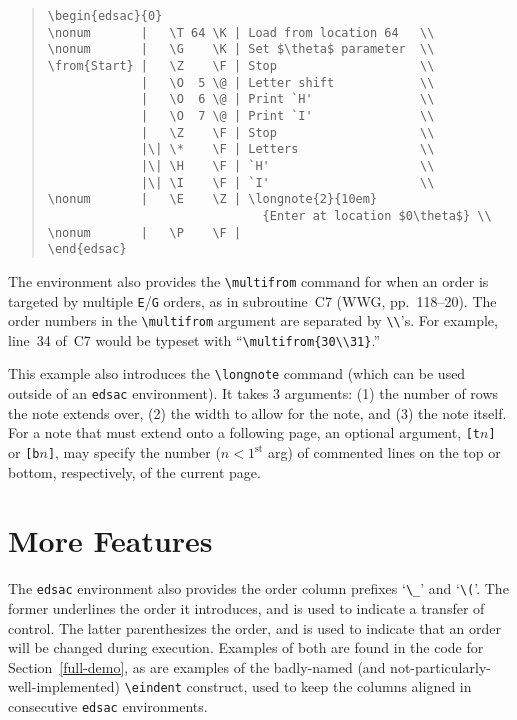 \documentclass[letterpaper,11pt]{article}
\begin{document}
\begin{quote}\small
\begin{verbatim}
\begin{edsac}{0}
\nonum       |   \T 64 \K | Load from location 64   \\
\nonum       |   \G    \K | Set $\theta$ parameter  \\
\from{Start} |   \Z    \F | Stop                    \\
             |   \O  5 \@ | Letter shift            \\
             |   \O  6 \@ | Print `H'               \\
             |   \O  7 \@ | Print `I'               \\
             |   \Z    \F | Stop                    \\
             |\| \*    \F | Letters                 \\
             |\| \H    \F | `H'                     \\
             |\| \I    \F | `I'                     \\
\nonum       |   \E    \Z | \longnote{2}{10em}
                              {Enter at location $0\theta$} \\
\nonum       |   \P    \F | 
\end{edsac}
\end{verbatim}
\end{quote}

The environment also provides the \verb"\multifrom" command for when an
order is targeted by multiple \verb"E"/\verb"G" orders, as in
subroutine~C7 (WWG, pp.\ 118--20).  The order numbers in the
\verb"\multifrom" argument are separated by \verb"\\"'s.  For example,
line~34 of~C7 would be typeset with ``\verb"\multifrom{30\\31}".''

This example also introduces the \verb"\longnote" command (which can
be used outside of an \texttt{edsac} environment).  It
takes 3 arguments:  (1) the number of rows the note extends over,
(2) the width to allow for the note, and (3) the note itself.  For
a note that must extend onto a following page, an optional argument,
\verb"[t"$n$\verb"]" or \verb"[b"$n$\verb"]", may specify the number
($n<1^{\mbox{st}}$ arg)
of commented lines on the top or bottom, respectively,
of the current page.

\section{More Features}
The \texttt{edsac} environment also provides the order column
prefixes `\verb"\_"' and `\verb"\("'.  The former underlines the order
it introduces, and is used to indicate a transfer of control.  The
latter parenthesizes the order, and is used to indicate that an order
will be changed during execution.  Examples of both are found in the
code for Section~\ref{full-demo}, as are examples of the badly-named
(and not-particularly-well-implemented)
\verb"\eindent" construct, used to keep the columns aligned in consecutive
\texttt{edsac} environments.
\end{document}
